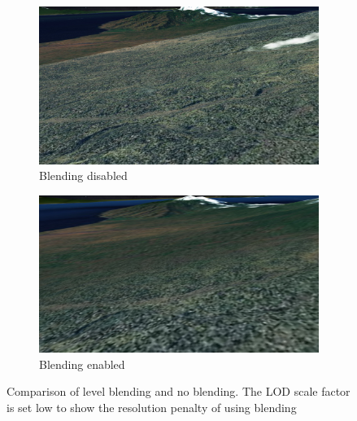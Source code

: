\begin{figure}[h]
    \centering
    \begin{subfigure}[bt]{0.48\textwidth}
        \includegraphics[width=\textwidth]{figures/results/blending/blending_bali_disabled.jpg}
        \caption{Blending disabled}
        \label{fig:blendingdisabled}
    \end{subfigure}
    \begin{subfigure}[bt]{0.48\textwidth}
        \includegraphics[width=\textwidth]{figures/results/blending/blending_bali_enabled.jpg}
        \caption{Blending enabled}
        \label{fig:blendingenabled}
    \end{subfigure}
    \caption{Comparison of level blending and no blending. The LOD scale factor is set low to show the resolution penalty of using blending}
    \label{fig:blending}
\end{figure}

